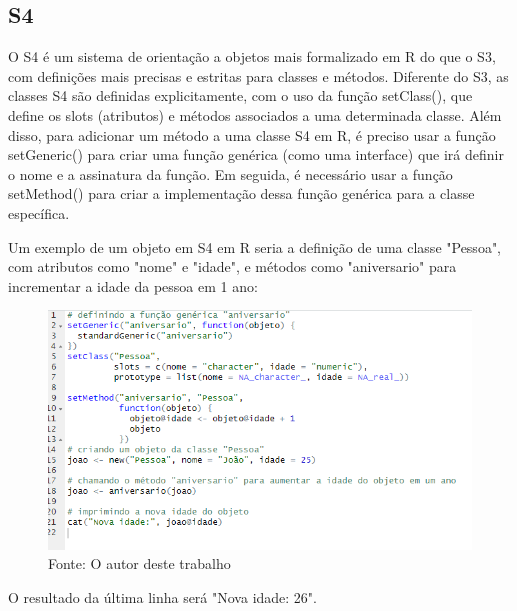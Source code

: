 	\subsection{S4}
		O S4 é um sistema de orientação a objetos mais formalizado em R do que o S3, com definições mais precisas e estritas para classes e métodos. Diferente do S3, as classes S4 são definidas explicitamente, com o uso da função setClass(), que define os slots (atributos) e métodos associados a uma determinada classe. Além disso, para adicionar um método a uma classe S4 em R, é preciso usar a função setGeneric() para criar uma função genérica (como uma interface) que irá definir o nome e a assinatura da função. Em seguida, é necessário usar a função setMethod() para criar a implementação dessa função genérica para a classe específica. \par 
		Um exemplo de um objeto em S4 em R seria a definição de uma classe "Pessoa", com atributos como "nome" e "idade", e métodos como "aniversario" para incrementar a idade da pessoa em 1 ano:\begin{figure}[H]
			\centering
			\caption{}
			\includegraphics[width=1.0\linewidth]{Prints/screenshot015}
			\label{fig:screenshot015}
			{\tiny \sf Fonte: O autor deste trabalho }
		\end{figure}
		O resultado da última linha será "Nova idade: 26".
